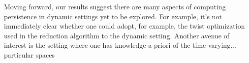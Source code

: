 \documentclass{siamart190516}
\newcommand\topstrut[1][1.1ex]{\setlength\bigstrutjot{#1}{\bigstrut[t]}}
\newcommand\botstrut[1][0.95ex]{\setlength\bigstrutjot{#1}{\bigstrut[b]}}
\DeclareMathOperator*{\argmin}{arg\,min}
\begin{document}
Moving forward, our results suggest there are many aspects of computing persistence in dynamic settings yet to be explored. For example, it's not immediately clear whether one could adopt, for example, the twist optimization used in the reduction algorithm to the dynamic setting. Another avenue of interest is the setting where one has knowledge a priori of the time-varying... particular spaces



%
%
\end{document}
